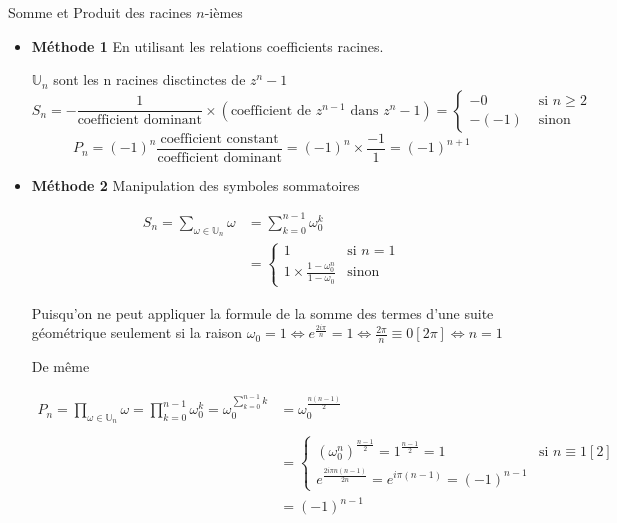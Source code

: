 \documentclass{article}
\renewenvironment{question_kholle}[2][ ]
{
	\subsection{\texorpdfstring{#2}{}}
	\notblank{#1}
	{
		\noindent #1
		\bigbreak
	}
	{}
	\begin{proof}
}
{
	\end{proof}
}
\begin{document}
\begin{question_kholle}{Somme et Produit des racines $n$-ièmes}
    \begin{itemize}[label=$\lozenge$]
        \item \textbf{Méthode 1} En utilisant les relations coefficients racines.

        $\mathbb{U}_{n}$ sont les n racines disctinctes de $z^{n}-1$
        $$S_{n} = - \frac{1}{\text{coefficient dominant}}\times(\text{coefficient de }z^{n-1} \text{ dans }z^{n}-1)= \left\{ \begin{array}{ll}
            -0  & \text{ si }  n\geqslant 2 \\
            -(-1)   & \text{ sinon}
        \end{array}\right.$$
        $$
        P_{n} = (-1)^{n} \frac{\text{coefficient constant}}{\text{coefficient dominant}} = (-1) ^{n}\times \frac{-1}{1} = (-1)^{n+1}
        $$
        
        \item \textbf{Méthode 2} Manipulation des symboles sommatoires
        
        \begin{align*}
            S_{n} = \sum_{\omega \in \mathbb{U}_{n}}\omega &= \sum_{k=0}^{n-1}\omega_{0}^{k}\\
            &= \left\{ \begin{array}{ll}
                1 & \text{si }  n =1 \\
                1 \times \frac{1 - \omega_{0}^{n}}{1-\omega_{0}}  & \text{sinon}
            \end{array}\right.
        \end{align*}
        
        Puisqu'on ne peut appliquer la formule de la somme des termes d'une suite géométrique seulement si la raison $\omega_{0} = 1 \iff e^{\frac{2i\pi}{n}} = 1 \iff \frac{2\pi}{n} \equiv 0 [2\pi] \iff n = 1$
        
        De même
        
        \begin{align*}
            P_{n} = \prod_{\omega \in \mathbb{U}_{n}}\omega = \prod_{k=0}^{n-1}\omega_{0}^{k}= \omega_{0}^{\sum_{k=0}^{n-1}k} &= \omega_{0} ^{\frac{n(n-1)}{2}}\\ \\
            &=\left\{ \begin{array}{ll}
                (\omega_{0}^{n})^{\frac{n-1}{2}} = 1^{\frac{n-1}{2}} = 1 & \text{si } n \equiv 1 [2] \\
                e^{\frac{2i\pi n(n-1)}{2n}} = e^{i \pi(n-1)} = (-1)^{n-1}
            \end{array}\right.
            \\ &= (-1)^{n-1}
        \end{align*}
    \end{itemize}
\end{question_kholle}
\end{document}
